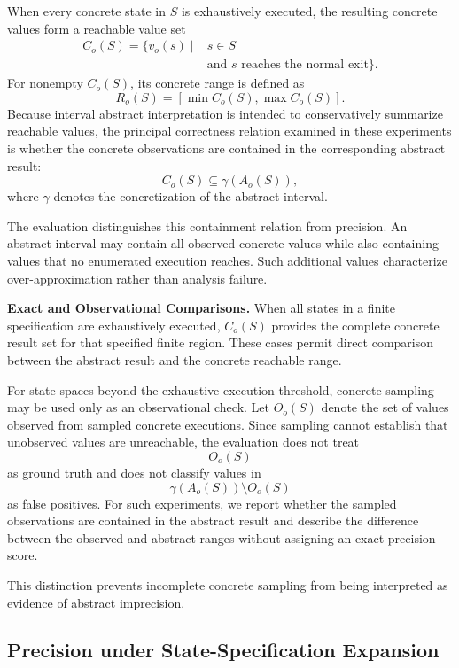 \documentclass[11pt,oneside]{report}
\theoremstyle{plain}
\theoremstyle{definition}
\theoremstyle{remark}
\begin{document}
When every concrete state in \(S\) is exhaustively executed, the resulting concrete values form a reachable value set
\[
\begin{aligned}
C_o(S)
=
\{v_o(s)\mid{} & s\in S \\
               & \text{and }s\text{ reaches the normal exit}\}.
\end{aligned}
\]
For nonempty \(C_o(S)\), its concrete range is defined as
\[
R_o(S)
=
[\min C_o(S),\max C_o(S)].
\]
Because interval abstract interpretation is intended to conservatively summarize reachable values, the principal correctness relation examined in these experiments is whether the concrete observations are contained in the corresponding abstract result:
\[
C_o(S)
\subseteq
\gamma(A_o(S)),
\]
where \(\gamma\) denotes the concretization of the abstract interval.

The evaluation distinguishes this containment relation from precision. An abstract interval may contain all observed concrete values while also containing values that no enumerated execution reaches. Such additional values characterize over-approximation rather than analysis failure.

\medskip
\noindent\textbf{Exact and Observational Comparisons.}
When all states in a finite specification are exhaustively executed, \(C_o(S)\) provides the complete concrete result set for that specified finite region. These cases permit direct comparison between the abstract result and the concrete reachable range.

For state spaces beyond the exhaustive-execution threshold, concrete sampling may be used only as an observational check. Let \(O_o(S)\) denote the set of values observed from sampled concrete executions. Since sampling cannot establish that unobserved values are unreachable, the evaluation does not treat
\[
O_o(S)
\]
as ground truth and does not classify values in
\[
\gamma(A_o(S))\setminus O_o(S)
\]
as false positives. For such experiments, we report whether the sampled observations are contained in the abstract result and describe the difference between the observed and abstract ranges without assigning an exact precision score.

This distinction prevents incomplete concrete sampling from being interpreted as evidence of abstract imprecision.

\subsection{Precision under State-Specification Expansion}
\label{subsec:eval:rq2:state}
\end{document}

